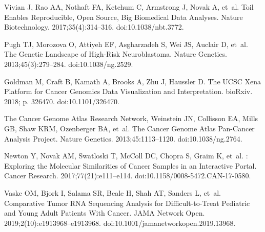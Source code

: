 \documentclass[10pt,letterpaper]{article}
\providecommand{\DIFaddbegin}{} %
\providecommand{\DIFaddend}{} %
\providecommand{\DIFdelbegin}{} %
\providecommand{\DIFdelend}{} %
\newcommand{\DIFscaledelfig}{0.5}
\newlength{\DIFdelgraphicswidth} %
\newlength{\DIFdelgraphicsheight} %
\newcommand{\DIFaddincludegraphics}[2][]{{\color{blue}\fbox{\DIFOincludegraphics[#1]{#2}}}} %
\newcommand{\DIFdelincludegraphics}[2][]{%
\sbox{\DIFdelgraphicsbox}{\DIFOincludegraphics[#1]{#2}}%
\settoboxwidth{\DIFdelgraphicswidth}{\DIFdelgraphicsbox} %
\settoboxtotalheight{\DIFdelgraphicsheight}{\DIFdelgraphicsbox} %
\scalebox{\DIFscaledelfig}{%
\parbox[b]{\DIFdelgraphicswidth}{\usebox{\DIFdelgraphicsbox}\\[-\baselineskip] \rule{\DIFdelgraphicswidth}{0em}}\llap{\resizebox{\DIFdelgraphicswidth}{\DIFdelgraphicsheight}{%
\setlength{\unitlength}{\DIFdelgraphicswidth}%
\begin{picture}(1,1)%
\thicklines\linethickness{2pt} %
{\color[rgb]{1,0,0}\put(0,0){\framebox(1,1){}}}%
{\color[rgb]{1,0,0}\put(0,0){\line( 1,1){1}}}%
{\color[rgb]{1,0,0}\put(0,1){\line(1,-1){1}}}%
\end{picture}%
}\hspace*{3pt}}} %
} %
\DeclareRobustCommand{\DIFaddbegin}{\DIFOaddbegin \let\includegraphics\DIFaddincludegraphics} %
\DeclareRobustCommand{\DIFaddend}{\DIFOaddend \let\includegraphics\DIFOincludegraphics} %
\DeclareRobustCommand{\DIFdelbegin}{\DIFOdelbegin \let\includegraphics\DIFdelincludegraphics} %
\DeclareRobustCommand{\DIFdelend}{\DIFOaddend \let\includegraphics\DIFOincludegraphics} %
\begin{document}
\DIFaddbegin 
\DIFaddend %


\begin{thebibliography}{10}
	\DIFdelbegin %

\DIFdelend {}
	Vivian J, Rao AA, Nothaft FA, Ketchum C, Armstrong J, Novak A, et~al.
	\newblock Toil Enables Reproducible, Open Source, Big Biomedical Data Analyses.
	\newblock Nature Biotechnology. 2017;35(4):314--316.
	\newblock doi:{10.1038/nbt.3772}.

	Pugh TJ, Morozova O, Attiyeh EF, Asgharzadeh S, Wei JS, Auclair D, et~al.
	\newblock The Genetic Landscape of High-Risk Neuroblastoma.
	\newblock Nature Genetics. 2013;45(3):279--284.
	\newblock doi:{10.1038/ng.2529}.

	Goldman M, Craft B, Kamath A, Brooks A, Zhu J, Haussler D.
	\newblock The {{UCSC Xena Platform}} for Cancer Genomics Data Visualization and
	Interpretation.
	\newblock bioRxiv. 2018; p. 326470.
	\newblock doi:{10.1101/326470}.

	{The Cancer Genome Atlas Research Network}, Weinstein JN, Collisson EA, Mills
	GB, Shaw KRM, Ozenberger BA, et~al.
	\newblock The {{Cancer Genome Atlas Pan}}-{{Cancer}} Analysis Project.
	\newblock Nature Genetics. 2013;45:1113--1120.
	\newblock doi:{10.1038/ng.2764}.

	Newton Y, Novak AM, Swatloski T, McColl DC, Chopra S, Graim K, et~al.
	: {{Exploring}} the {{Molecular Similarities}} of
	{{Cancer Samples}} in an {{Interactive Portal}}.
	\newblock Cancer Research. 2017;77(21):e111--e114.
	\newblock doi:{10.1158/0008-5472.CAN-17-0580}.

	Vaske OM, Bjork I, Salama SR, Beale H, Shah AT, Sanders L, et~al.
	\newblock Comparative {{Tumor RNA Sequencing Analysis}} for
	{{Difficult}}-to-{{Treat Pediatric}} and {{Young Adult Patients With
			Cancer}}.
	\newblock JAMA Network Open. 2019;2(10):e1913968--e1913968.
	\newblock doi:{10.1001/jamanetworkopen.2019.13968}.


\end{thebibliography}
\end{document}
